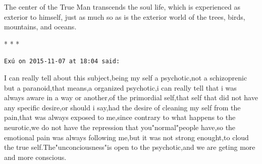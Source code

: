 The center of the True Man transcends the soul life, which is experienced as exterior to himself, just as much so as is the exterior world of the trees, birds, mountains, and oceans.




\begin{center}* * *\end{center}

\begin{footnotesize}\begin{sffamily}



\texttt{Exú on 2015-11-07 at 18:04 said: }

I can really tell about this subject,being my self a psychotic,not a schizoprenic but a paranoid,that means,a organized psychotic,i can really tell that i was always aware in a way or another,of the primordial self,that self that did not have any specific desire,or should i say,had the desire of cleaning my self from the pain,that was always exposed to me,since contrary to what happens to the neurotic,we do not have the repression that you"normal"people have,so the emotional pain was always following me,but it was not strong enought,to cloud the true self.The"unconciousness"is open to the psychotic,and we are geting more and more conscious.

\end{sffamily}\end{footnotesize}

